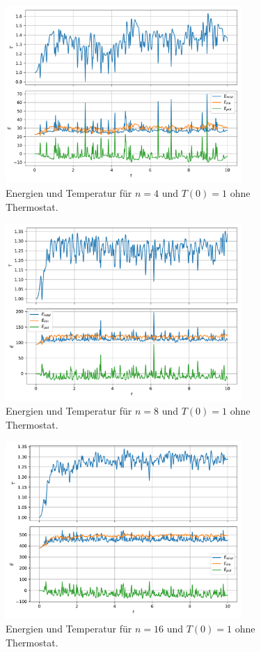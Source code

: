 \begin{figure}
    \centering
    \includegraphics[width=0.8\textwidth]{content/plots/observable_n4_T1_nothermo.pdf}
    \caption{Energien und Temperatur für $n=4$ und $T(0)=1$ ohne Thermostat.}
    \label{fig:obs4}
\end{figure}
\begin{figure}
    \centering
    \includegraphics[width=0.8\textwidth]{content/plots/observable_n8_T1_nothermo.pdf}
    \caption{Energien und Temperatur für $n=8$ und $T(0)=1$ ohne Thermostat.}
    \label{fig:obs8}
\end{figure}
\begin{figure}
    \centering
    \includegraphics[width=0.8\textwidth]{content/plots/observable_n16_T1_nothermo.pdf}
    \caption{Energien und Temperatur für $n=16$ und $T(0)=1$ ohne Thermostat.}
    \label{fig:obs16}
\end{figure}
\FloatBarrier

